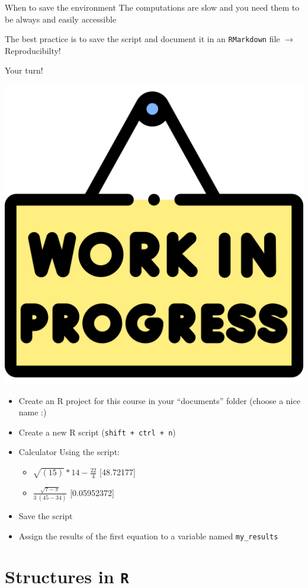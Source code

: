 \documentclass[
  ignorenonframetext,
]{beamer}
\providecommand{\tightlist}{%
  \setlength{\itemsep}{0pt}\setlength{\parskip}{0pt}}
\begin{document}
\begin{frame}[fragile]{When to save the environment}
\protect\hypertarget{when-to-save-the-environment}{}
The computations are slow and you need them to be always and easily
accessible

The best practice is to save the script and document it in an
\texttt{RMarkdown} file \(\rightarrow\) Reproducibilty!
\end{frame}

\begin{frame}[fragile]{Your turn!}
\protect\hypertarget{your-turn}{}
\begin{center}\includegraphics[width=0.1\linewidth]{img/work} \end{center}

\footnotesize

\begin{itemize}
\item
  Create an R project for this course in your ``documents'' folder
  (choose a nice name :)
\item
  Create a new R script (\texttt{shift\ +\ ctrl\ +\ n})
\item
  Calculator Using the script:

  \begin{itemize}
  \tightlist
  \item
    \(\sqrt{(15)} * 14 - \frac{22}{4}\) {[}48.72177{]}
  \item
    \(\frac{\sqrt{7-\pi}}{3\ (45-34)}\) {[}0.05952372{]}
  \end{itemize}
\item
  Save the script
\item
  Assign the results of the first equation to a variable named
  \texttt{my\_results}
\end{itemize}
\end{frame}

\hypertarget{structures-in-r}{%
\section{\texorpdfstring{Structures in
\texttt{R}}{Structures in R}}\label{structures-in-r}}
\end{document}
